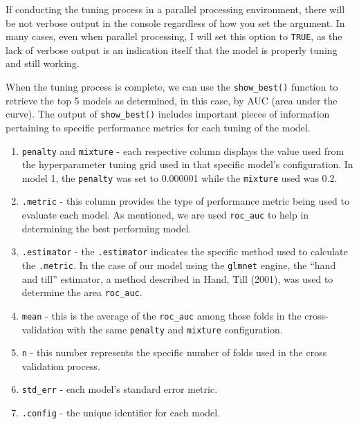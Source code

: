 \documentclass[
  letterpaper,
]{krantz}
\providecommand{\tightlist}{%
  \setlength{\itemsep}{0pt}\setlength{\parskip}{0pt}}\usepackage{longtable,booktabs,array}
\begin{document}
\begin{tcolorbox}[enhanced jigsaw, colback=white, leftrule=.75mm, breakable, colframe=quarto-callout-note-color-frame, bottomtitle=1mm, rightrule=.15mm, left=2mm, opacityback=0, bottomrule=.15mm, arc=.35mm, coltitle=black, colbacktitle=quarto-callout-note-color!10!white, toptitle=1mm, titlerule=0mm, title=\textcolor{quarto-callout-note-color}{\faInfo}\hspace{0.5em}{Note}, toprule=.15mm, opacitybacktitle=0.6]

If conducting the tuning process in a parallel processing environment,
there will be not verbose output in the console regardless of how you
set the argument. In many cases, even when parallel processing, I will
set this option to \texttt{TRUE}, as the lack of verbose output is an
indication itself that the model is properly tuning and still working.

\end{tcolorbox}

When the tuning process is complete, we can use the
\texttt{show\_best()} function to retrieve the top 5 models as
determined, in this case, by AUC (area under the curve). The output of
\texttt{show\_best()} includes important pieces of information
pertaining to specific performance metrics for each tuning of the model.

\begin{enumerate}
\def\labelenumi{\arabic{enumi}.}
\tightlist
\item
  \texttt{penalty} and \texttt{mixture} - each respective column
  displays the value used from the hyperparameter tuning grid used in
  that specific model's configuration. In model 1, the \texttt{penalty}
  was set to 0.000001 while the \texttt{mixture} used was 0.2.
\item
  \texttt{.metric} - this column provides the type of performance metric
  being used to evaluate each model. As mentioned, we are used
  \texttt{roc\_auc} to help in determining the best performing model.
\item
  \texttt{.estimator} - the \texttt{.estimator} indicates the specific
  method used to calculate the \texttt{.metric}. In the case of our
  model using the \texttt{glmnet} engine, the ``hand and till''
  estimator, a method described in Hand, Till (2001), was used to
  determine the area \texttt{roc\_auc}.
\item
  \texttt{mean} - this is the average of the \texttt{roc\_auc} among
  those folds in the cross-validation with the same \texttt{penalty} and
  \texttt{mixture} configuration.
\item
  \texttt{n} - this number represents the specific number of folds used
  in the cross validation process.
\item
  \texttt{std\_err} - each model's standard error metric.
\item
  \texttt{.config} - the unique identifier for each model.
\end{enumerate}
\end{document}
